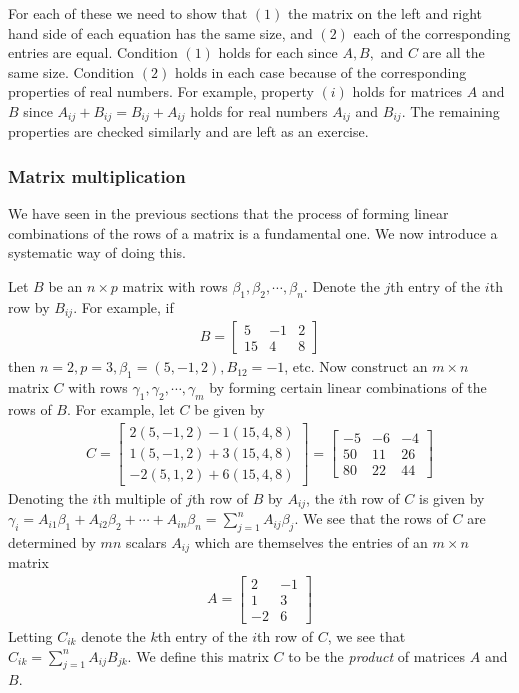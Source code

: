 \documentclass[12pt,letterpaper,reqno]{article}
\numberwithin{equation}{section}
\newcommand{\ti}[1]{\textit{#1}}
\begin{document}
\begin{pf}
For each of these we need to show that $(1)$ the matrix on the left and right hand side of each equation has the same size, and $(2)$ each of the corresponding entries are equal. Condition $(1)$ holds for each since $A,B,$ and $C$ are all the same size. Condition $(2)$ holds in each case because of the corresponding properties of real numbers. For example, property $(i)$ holds for matrices $A$ and $B$ since $A_{ij}+B_{ij}=B_{ij}+A_{ij}$ holds for real numbers $A_{ij}$ and $B_{ij}$. The remaining properties are checked similarly and are left as an exercise.
\end{pf}

\subsubsection{Matrix multiplication}
We have seen in the previous sections that the process of forming linear combinations of the rows of a matrix is a fundamental one. We now introduce a systematic way of doing this. 

Let $B$ be an $n \times p$ matrix with rows $\beta_1,\beta_2,\cdots, \beta_n$. Denote the $j$th entry of the $i$th row by $B_{ij}$. For example, if
\begin{align*}
	B=\begin{bmatrix}
		5&-1&2 \\ 15&4&8
	\end{bmatrix}
\end{align*}
then $n=2, p=3, \beta_1=(5,-1,2), B_{12}=-1$, etc. Now construct an $m \times n$ matrix $C$ with rows $\gamma_1, \gamma_2,\cdots, \gamma_m$ by forming certain linear combinations of the rows of $B$. For example, let $C$ be given by
\begin{align*}
	C=\begin{bmatrix}
		2(5,-1,2)-1(15,4,8)\\
		1(5,-1,2)+3(15,4,8)\\
		-2(5,1,2)+6(15,4,8)
	\end{bmatrix}=\begin{bmatrix}
		-5&-6&-4 \\
		50&11&26 \\
		80&22&44
	\end{bmatrix}
\end{align*} 
Denoting the $i$th multiple of $j$th row of $B$ by $A_{ij}$, the $i$th row of $C$ is given by $\gamma_i=A_{i1}\beta_1+A_{i2}\beta_2+\cdots+A_{in}\beta_n=\sum_{j=1}^nA_{ij}\beta_j$. We see that the rows of $C$ are determined by $mn$ scalars $A_{ij}$ which are themselves the entries of an $m \times n$ matrix 
	\begin{align*}
		A=\begin{bmatrix}
			2&-1\\1&3\\-2&6
		\end{bmatrix}
	\end{align*}
Letting $C_{ik}$ denote the $k$th entry of the $i$th row of $C$, we see that $C_{ik}=\sum_{j=1}^n A_{ij}B_{jk}$. We define this matrix $C$ to be the \ti{product} of matrices $A$ and $B$.
\end{document}
